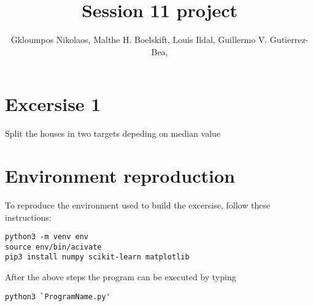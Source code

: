 \documentclass{article}
\title{Session 11 project}
\author {
      Gkloumpos Nikolaos,
      Malthe H. Boelskift,
      Louis Ildal,
      Guillermo V. Gutierrez-Bea,
}
\begin{document}
\maketitle


\section{Excersise 1} 
Split the houses in two targets depeding on median value

\section {Environment reproduction}
To reproduce the environment used to build the excersise, follow these instructions:

\begin{verbatim}
python3 -m venv env
source env/bin/acivate
pip3 install numpy scikit-learn matplotlib
\end{verbatim}

After the above steps the program can be executed by typing

\begin{verbatim}
python3 `ProgramName.py'
\end{verbatim}



\end{document}
